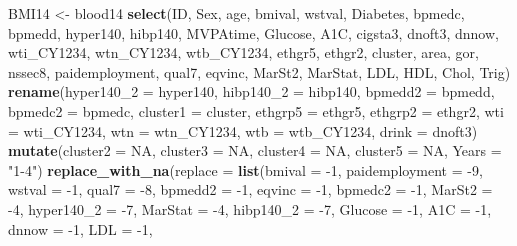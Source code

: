 \documentclass[]{article}
\newenvironment{Shaded}{\begin{snugshade}}{\end{snugshade}}
\newcommand{\KeywordTok}[1]{\textcolor[rgb]{0.12,0.11,0.11}{\textbf{#1}}}
\newcommand{\DataTypeTok}[1]{\textcolor[rgb]{0.00,0.34,0.68}{#1}}
\newcommand{\DecValTok}[1]{\textcolor[rgb]{0.69,0.50,0.00}{#1}}
\newcommand{\StringTok}[1]{\textcolor[rgb]{0.75,0.01,0.01}{#1}}
\newcommand{\OtherTok}[1]{\textcolor[rgb]{0.00,0.43,0.16}{#1}}
\newcommand{\OperatorTok}[1]{\textcolor[rgb]{0.12,0.11,0.11}{#1}}
\newcommand{\NormalTok}[1]{\textcolor[rgb]{0.12,0.11,0.11}{#1}}
\begin{document}
\begin{Shaded}
\begin{Highlighting}[]
{{{{{{{{{{{{{{{{{{{{{{{{{{{{{{{{{{{{{{{{{{{{{{{{{\NormalTok{BMI14 <-}\StringTok{ }\NormalTok{blood14 }\OperatorTok{%>%}\StringTok{ }
\StringTok{  }\KeywordTok{select}\NormalTok{(ID, Sex, age, bmival, wstval, Diabetes, bpmedc, bpmedd, hyper140, }
\NormalTok{         hibp140, MVPAtime, Glucose, A1C, cigsta3, dnoft3, dnnow, }
\NormalTok{         wti_CY1234, wtn_CY1234, wtb_CY1234, ethgr5, ethgr2, cluster, }
\NormalTok{         area, gor, nssec8, paidemployment, qual7, eqvinc, MarSt2, }
\NormalTok{         MarStat, LDL, HDL, Chol, Trig) }\OperatorTok{%>%}
\StringTok{  }\KeywordTok{rename}\NormalTok{(}\DataTypeTok{hyper140_2 =}\NormalTok{ hyper140, }\DataTypeTok{hibp140_2 =}\NormalTok{ hibp140, }\DataTypeTok{bpmedd2 =}\NormalTok{ bpmedd, }
         \DataTypeTok{bpmedc2 =}\NormalTok{ bpmedc, }\DataTypeTok{cluster1 =}\NormalTok{ cluster, }\DataTypeTok{ethgrp5 =}\NormalTok{ ethgr5, }
         \DataTypeTok{ethgrp2 =}\NormalTok{ ethgr2, }\DataTypeTok{wti =}\NormalTok{ wti_CY1234, }\DataTypeTok{wtn =}\NormalTok{ wtn_CY1234, }
         \DataTypeTok{wtb =}\NormalTok{  wtb_CY1234, }\DataTypeTok{drink =}\NormalTok{ dnoft3) }\OperatorTok{%>%}\StringTok{ }
\StringTok{  }\KeywordTok{mutate}\NormalTok{(}\DataTypeTok{cluster2 =} \OtherTok{NA}\NormalTok{, }\DataTypeTok{cluster3 =} \OtherTok{NA}\NormalTok{, }\DataTypeTok{cluster4 =} \OtherTok{NA}\NormalTok{, }\DataTypeTok{cluster5 =} \OtherTok{NA}\NormalTok{, }
         \DataTypeTok{Years =} \StringTok{"1-4"}\NormalTok{) }\OperatorTok{%>%}\StringTok{ }
\StringTok{  }\KeywordTok{replace_with_na}\NormalTok{(}\DataTypeTok{replace =} \KeywordTok{list}\NormalTok{(}\DataTypeTok{bmival =} \OperatorTok{-}\DecValTok{1}\NormalTok{, }\DataTypeTok{paidemployment =} \OperatorTok{-}\DecValTok{9}\NormalTok{, }
                                 \DataTypeTok{wstval =} \OperatorTok{-}\DecValTok{1}\NormalTok{, }\DataTypeTok{qual7 =} \OperatorTok{-}\DecValTok{8}\NormalTok{,}
                                 \DataTypeTok{bpmedd2 =} \OperatorTok{-}\DecValTok{1}\NormalTok{, }\DataTypeTok{eqvinc =} \OperatorTok{-}\DecValTok{1}\NormalTok{,}
                                 \DataTypeTok{bpmedc2 =} \OperatorTok{-}\DecValTok{1}\NormalTok{, }\DataTypeTok{MarSt2 =} \OperatorTok{-}\DecValTok{4}\NormalTok{, }
                                 \DataTypeTok{hyper140_2 =} \OperatorTok{-}\DecValTok{7}\NormalTok{, }\DataTypeTok{MarStat =} \OperatorTok{-}\DecValTok{4}\NormalTok{,}
                                 \DataTypeTok{hibp140_2 =} \OperatorTok{-}\DecValTok{7}\NormalTok{,  }\DataTypeTok{Glucose =} \OperatorTok{-}\DecValTok{1}\NormalTok{, }
                                 \DataTypeTok{A1C  =} \OperatorTok{-}\DecValTok{1}\NormalTok{,  }\DataTypeTok{dnnow =} \OperatorTok{-}\DecValTok{1}\NormalTok{, }\DataTypeTok{LDL =} \OperatorTok{-}\DecValTok{1}\NormalTok{, }
}}}}}}}}}}}}}}}}}}}}}}}}}}}}}}}}}}}}}}}}}}}}}}}}}}}}}
\end{Highlighting}
\end{Shaded}
\end{document}

